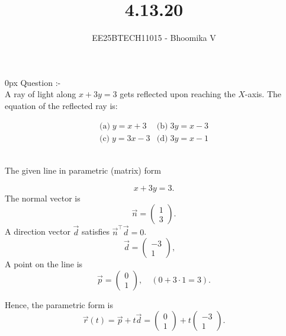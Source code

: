 \documentclass[journal]{IEEEtran}
\begin{document}

\vspace{3cm}

\title{4.13.20}
\author{EE25BTECH11015 - Bhoomika V}
{\let\newpage\relax\maketitle}

\renewcommand{\thefigure}{\theenumi}
\renewcommand{\thetable}{\theenumi}
\setlength{\intextsep}{10pt} %


\renewcommand{\thetable}{\theenumi}
\parindent 0px 
{Question :-} \\ 
A ray of light along $x + 3y = 3$ gets reflected upon reaching the $X$-axis.  
The equation of the reflected ray is:  

\[
\begin{array}{cc}
\text{(a)} \; y = x + 3 & \text{(b)} \; 3y = x - 3 \\[8pt]
\text{(c)} \; y = 3x - 3 & \text{(d)} \; 3y = x - 1
\end{array}
\]

\solution \\

The given line in parametric (matrix) form

\[
x+3y=3.
\]
The normal vector is 
\[
\vec{n}=\begin{pmatrix}1\\3\end{pmatrix}.
\]
A direction vector $\vec{d}$ satisfies $\vec{n}^\top \vec{d}=0$.  
\[
\vec{d}=\begin{pmatrix}-3\\1\end{pmatrix}, 
\quad 
\]
A point on the line is 
\[
\vec{p}=\begin{pmatrix}0\\1\end{pmatrix}, \quad (0+3\cdot 1=3).
\]

Hence, the parametric form is
\[
\vec{r}(t)=\vec{p}+t\vec{d}
=\begin{pmatrix}0\\1\end{pmatrix}+t\begin{pmatrix}-3\\1\end{pmatrix}.
\]
\end{document}
